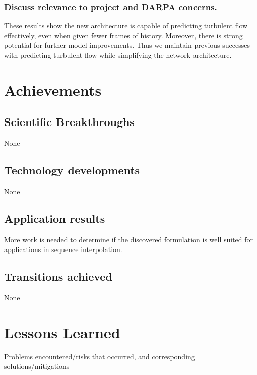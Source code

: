 \documentclass[12pt]{article}
\theoremstyle{plain}
\theoremstyle{remark}
\theoremstyle{definition}
\begin{document}
    \subsubsection{Discuss relevance to project and DARPA concerns.}
    These results show the new architecture is capable of predicting turbulent flow effectively, even when given fewer frames of history. Moreover, there is strong potential for further model improvements. Thus we maintain previous successes with predicting turbulent flow while simplifying the network architecture.

    \section{Achievements}

    \subsection{Scientific Breakthroughs}

    None

    \subsection{Technology developments}

    None

    \subsection{Application results}

    More work is needed to determine if the discovered formulation is well suited for applications in sequence interpolation.

    \subsection{Transitions achieved}

    None

    \section{Lessons Learned}

    \noindent

    \noindent Problems encountered/risks that occurred, and corresponding solutions/mitigations
\end{document}
